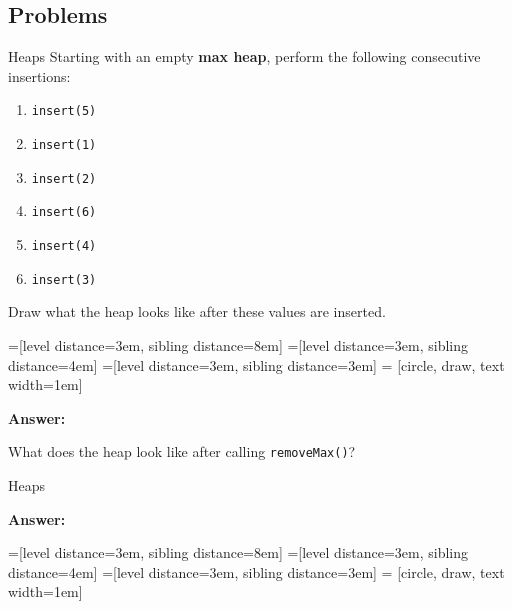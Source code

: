 \documentclass[9pt]{beamer}
\begin{document}
\subsection{Problems}

\begin{frame}[fragile]{Heaps}
  Starting with an empty {\bf max heap}, perform the following consecutive insertions:
  \begin{enumerate}
    \item
      {\tt insert(5)}
    \item
      {\tt insert(1)}
    \item
      {\tt insert(2)}
    \item
      {\tt insert(6)}
    \item
      {\tt insert(4)}
    \item
      {\tt insert(3)}
  \end{enumerate}

  Draw what the heap looks like after these values are inserted.

  =[level distance=3em, sibling distance=8em]
  =[level distance=3em, sibling distance=4em]
  =[level distance=3em, sibling distance=3em]
   = [circle, draw, text width=1em]

  \pause
  {\bf Answer:}


  \pause
  What does the heap look like after calling {\tt removeMax()}?
\end{frame}

\begin{frame}[fragile]{Heaps}

  {\bf Answer:}

  =[level distance=3em, sibling distance=8em]
  =[level distance=3em, sibling distance=4em]
  =[level distance=3em, sibling distance=3em]
   = [circle, draw, text width=1em]

\end{frame}
\end{document}
